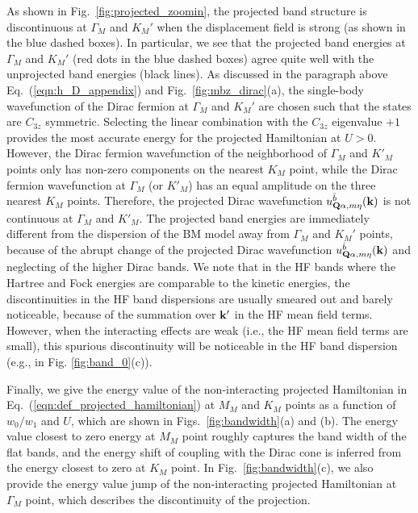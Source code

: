 \documentclass[prb,aps,nofootinbib,amssymb,twocolumn,superscriptaddress,10pt]{revtex4-2}
\begin{document}
\begin{widetext}
As shown in Fig.~\ref{fig:projected_zoomin}, the projected band structure is discontinuous at $\Gamma_M$ and $K_M'$ when the displacement field is strong (as shown in the blue dashed boxes). In particular, we see that the projected band energies at $\Gamma_M$ and $K_M'$ (red dots in the blue dashed boxes) agree quite well with the unprojected band energies (black lines).
As discussed in the paragraph above Eq.~(\ref{eqn:h_D_appendix}) and Fig.~\ref{fig:mbz_dirac}(a), the single-body wavefunction of the Dirac fermion at $\Gamma_M$ and $K_M'$ are chosen such that the states are $C_{3z}$ symmetric. Selecting the linear combination with the $C_{3z}$ eigenvalue $+1$ provides the most accurate energy for the projected Hamiltonian at $U>0$.
However, the Dirac fermion wavefunction of the neighborhood of $\Gamma_M$ and $K'_M$ points only has non-zero components on the nearest $K_M$ point, while the Dirac fermion wavefunction at $\Gamma_M$ (or $K'_M$) has an equal amplitude on the three nearest $K_M$ points.
Therefore, the projected Dirac wavefunction $u^{\hat{b}}_{\mathbf{Q}\alpha,m\eta}(\mathbf{k})$ is not continuous at $\Gamma_M$ and $K'_M$. 
The projected band energies are immediately different from the dispersion of the BM model away from $\Gamma_M$ and $K_M'$ points, because of the abrupt change of the projected Dirac wavefunction $u^{\hat{b}}_{\mathbf{Q}\alpha,m\eta}(\mathbf{k})$ and neglecting of the higher Dirac bands.
We note that in the HF bands where the Hartree and Fock energies are comparable to the kinetic energies, the discontinuities in the HF band dispersions are usually smeared out and barely noticeable, because of the summation over $\mathbf{k}'$ in the HF mean field terms. However, when the interacting effects are weak (i.e., the HF mean field terms are small), this spurious discontinuity will be noticeable in the HF band dispersion (e.g., in Fig. \ref{fig:band_0}(c)).

Finally, we give the energy value of the non-interacting projected Hamiltonian in Eq.~(\ref{eqn:def_projected_hamiltonian}) at $M_M$ and $K_M$ points as a function of $w_0/w_1$ and $U$, which are shown in Figs.~\ref{fig:bandwidth}(a) and (b). The energy value closest to zero energy at $M_M$ point roughly captures the band width of the flat bands, and the energy shift of coupling with the Dirac cone is inferred from the energy closest to zero at $K_M$ point. In Fig.~\ref{fig:bandwidth}(c), we also provide the energy value jump of the non-interacting projected Hamiltonian at $\Gamma_M$ point, which describes the discontinuity of the projection.



\end{widetext}
\end{document}
